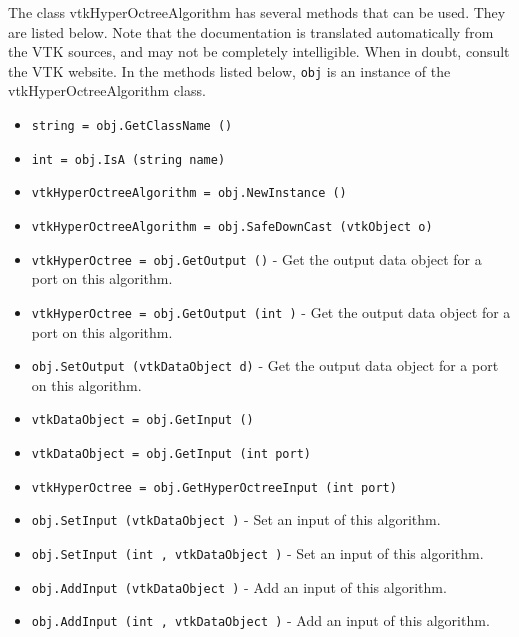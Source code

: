 The class vtkHyperOctreeAlgorithm has several methods that can be used.
  They are listed below.
Note that the documentation is translated automatically from the VTK sources,
and may not be completely intelligible.  When in doubt, consult the VTK website.
In the methods listed below, \verb|obj| is an instance of the vtkHyperOctreeAlgorithm class.
\begin{itemize}
\item  \verb|string = obj.GetClassName ()|

\item  \verb|int = obj.IsA (string name)|

\item  \verb|vtkHyperOctreeAlgorithm = obj.NewInstance ()|

\item  \verb|vtkHyperOctreeAlgorithm = obj.SafeDownCast (vtkObject o)|

\item  \verb|vtkHyperOctree = obj.GetOutput ()| -  Get the output data object for a port on this algorithm.

\item  \verb|vtkHyperOctree = obj.GetOutput (int )| -  Get the output data object for a port on this algorithm.

\item  \verb|obj.SetOutput (vtkDataObject d)| -  Get the output data object for a port on this algorithm.

\item  \verb|vtkDataObject = obj.GetInput ()|

\item  \verb|vtkDataObject = obj.GetInput (int port)|

\item  \verb|vtkHyperOctree = obj.GetHyperOctreeInput (int port)|

\item  \verb|obj.SetInput (vtkDataObject )| -  Set an input of this algorithm.

\item  \verb|obj.SetInput (int , vtkDataObject )| -  Set an input of this algorithm.

\item  \verb|obj.AddInput (vtkDataObject )| -  Add an input of this algorithm.

\item  \verb|obj.AddInput (int , vtkDataObject )| -  Add an input of this algorithm.

\end{itemize}
